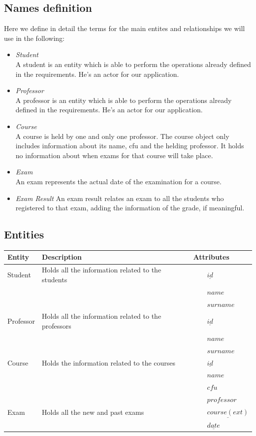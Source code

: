 \documentclass{report}
\newcommand{\tabitem}{~~\llap{\textbullet}~~}
\begin{document}
\subsection*{Names definition}
Here we define in detail the terms for the main entites and relationships we will use in the following:
\begin{itemize}
	\item \textit{Student}\\ A student is an entity which is able to perform the operations already defined in the requirements. He's an actor for our application. 	
	\item \textit{Professor}\\ A professor is an entity which is able to perform the operations already defined in the requirements. He's an actor for our application. 	
	\item \textit{Course}\\ A course is held by one and only one professor. The course object only includes information about its name, cfu and the helding professor. It holds no information about when exams for that course will take place. 	
	\item \textit{Exam}\\ An exam represents the actual date of the examination for a course.
	\item \textit{Exam Result} An exam result relates an exam to all the students who registered to that exam, adding the information of the grade, if meaningful.\\
\end{itemize} 

\subsection*{Entities}
\begin{table}[ht]
	\centering
	\begin{tabular}{| m{6em} | m{15em} | m{8em} |}
		\hline
		\textbf{Entity} & \textbf{Description} & \textbf{Attributes} \\
		\hline
		Student & Holds all the information related to the students & 
		\tabitem $\underline{id}$ \\
		 & &\tabitem $name$ \\
		 & &\tabitem $surname$ \\
		\hline
		Professor & Holds all the information related to the professors & 
		\tabitem $\underline{id}$ \\
		& &\tabitem $name$ \\
		& &\tabitem $surname$ \\
		\hline
		Course & Holds the information related to the courses & 
		\tabitem $\underline{id}$ \\
		& &\tabitem $name$ \\
		& &\tabitem $cfu$ \\
		& &\tabitem $professor$ \\
		\hline
		Exam & Holds all the new and past exams& 
		\tabitem $\underline{course (ext)}$ \\
		& &\tabitem $\underline{date}$ \\
		\hline
	\end{tabular}
\end{table}
\end{document}
